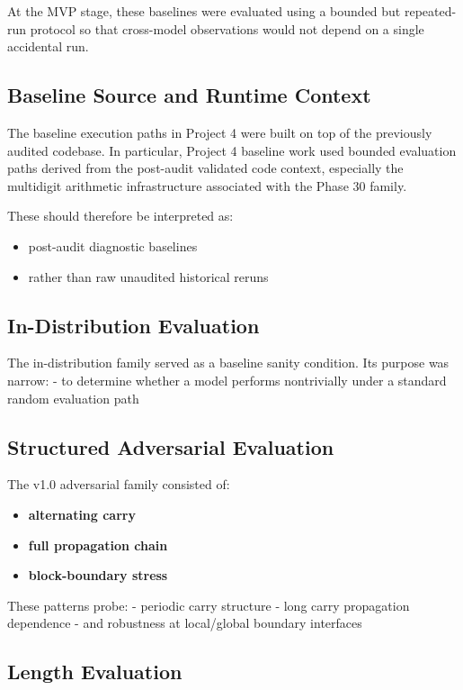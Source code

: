 \documentclass[11pt]{article}
\begin{document}
At the MVP stage, these baselines were evaluated using a bounded but repeated-run protocol so that cross-model observations would not depend on a single accidental run.

\subsection{Baseline Source and Runtime Context}

The baseline execution paths in Project 4 were built on top of the previously audited codebase. In particular, Project 4 baseline work used bounded evaluation paths derived from the post-audit validated code context, especially the multidigit arithmetic infrastructure associated with the Phase 30 family.

These should therefore be interpreted as:
\begin{itemize}[leftmargin=1.5em]
    \item post-audit diagnostic baselines
    \item rather than raw unaudited historical reruns
\end{itemize}

\subsection{In-Distribution Evaluation}

The in-distribution family served as a baseline sanity condition. Its purpose was narrow:
- to determine whether a model performs nontrivially under a standard random evaluation path

\subsection{Structured Adversarial Evaluation}

The v1.0 adversarial family consisted of:
\begin{itemize}[leftmargin=1.5em]
    \item \textbf{alternating carry}
    \item \textbf{full propagation chain}
    \item \textbf{block-boundary stress}
\end{itemize}

These patterns probe:
- periodic carry structure
- long carry propagation dependence
- and robustness at local/global boundary interfaces

\subsection{Length Evaluation}
\end{document}
